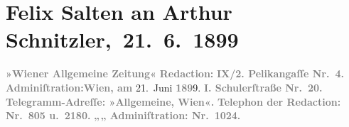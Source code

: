 

         
         \renewcommand{\erwaehntePersonen}{Personen: Paul Goldmann, Georg Hirschfeld, Hugo von Hofmannsthal, Felix Salten, Gustav Schwarzkopf, Julius Szeps}
         \renewcommand{\erwaehnteInstitutionen}{Institutionen: Burgtheater, Wiener Allgemeine Zeitung}
         \renewcommand{\erwaehnteOrte}{Orte: Berlin, Budapest, Pelikangasse, Schulerstraße, Slawonien, Wien}
         \renewcommand{\erwaehnteWerke}{Werke: ?? [Feuilleton über Paul Goldmann], Reigen. Zehn Dialoge, Scene aus der »Hochzeit der Sobeide«. (Ältere Niederschrift. Wien 1897. — Ungedruckt.), Wiener Allgemeine Montags-Zeitung, Wiener Allgemeine Rundschau}
               \section[ Felix Salten an Arthur Schnitzler, 21. 6. 1899]{ Felix Salten an Arthur Schnitzler, 21. 6. 1899}\nopagebreak{}\rehead{ }\begin{ledgroupsized}[t]{13cm}\normalsize\beginnumbering \toendnotes[C]{\smallbreak\pagebreak[2]} 
\toendnotes[C]{\smallbreak}\pstart
           \noindent{}{\pb}\textcolor{gray}{\textbf{\textbf{»Wiener Allgemeine
                        Zeitung«}}}\pend
           \pstart
           \textcolor{gray}{\textbf{Redaction:}}\pend
           \pstart
           \textcolor{gray}{\textbf{IX/2. \textbf{Pelikangaſſe
                        Nr.} 4. }}\pend
           \pstart
           \textcolor{gray}{\textbf{Adminiſtration:}}\hfill \textcolor{gray}{\textbf{Wien, am}}{ }21. Juni \textcolor{gray}{\textbf{189}}9.\pend
           \pstart
           \textcolor{gray}{\textbf{I. \textbf{Schulerſtraße
                        Nr.} 20. }}\pend
           \pstart
           \textcolor{gray}{\textbf{Telegramm-Adreſſe: »Allgemeine, Wien«.}}\pend
           \pstart
           \textcolor{gray}{\textbf{Telephon der Redaction: Nr. 805 u. 2180.}}\pend
           \pstart
           \textcolor{gray}{\textbf{\hspace*{1.5em}„\hspace*{1.5em}„\hspace*{1.5em} Adminiſtration: Nr. 1024.}}\pend

\end{ledgroupsized}
